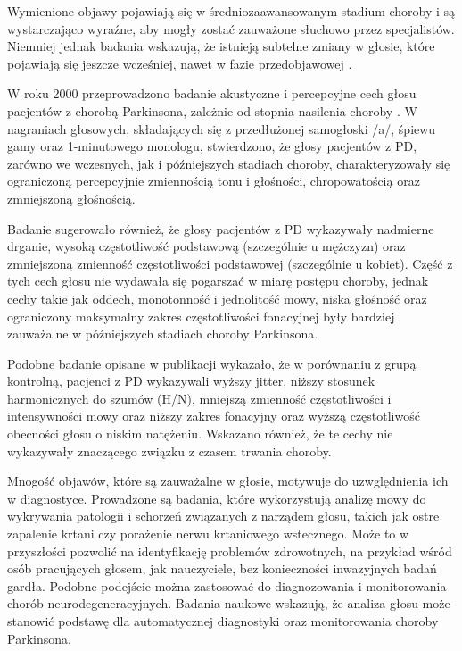 Wymienione objawy pojawiają się w średniozaawansowanym stadium choroby i są wystarczająco wyraźne, aby mogły zostać zauważone słuchowo przez specjalistów.
Niemniej jednak badania wskazują, że istnieją subtelne zmiany w głosie, które pojawiają się jeszcze wcześniej, nawet w fazie przedobjawowej \cite{2023_PD_voice}.

W roku 2000 przeprowadzono badanie akustyczne i percepcyjne cech głosu pacjentów z chorobą Parkinsona, zależnie od stopnia nasilenia choroby \cite{https://doi.org/10.1080/136828200410654}.
W nagraniach głosowych, składających się z przedłużonej samogłoski /a/, śpiewu gamy oraz 1-minutowego monologu, stwierdzono, że głosy pacjentów z PD,
zarówno we wczesnych, jak i późniejszych stadiach choroby, charakteryzowały się ograniczoną percepcyjnie zmiennością tonu i głośności, chropowatością
oraz zmniejszoną głośnością.

Badanie sugerowało również, że głosy pacjentów z PD wykazywały nadmierne drganie, wysoką częstotliwość podstawową (szczególnie u mężczyzn) oraz zmniejszoną zmienność częstotliwości podstawowej (szczególnie u kobiet).
Część z tych cech głosu nie wydawała się pogarszać w miarę postępu choroby, jednak cechy takie jak oddech, monotonność i jednolitość mowy, niska głośność oraz ograniczony maksymalny zakres częstotliwości fonacyjnej były bardziej zauważalne w późniejszych stadiach choroby Parkinsona.

Podobne badanie opisane w publikacji \cite{GAMBOA1997314} wykazało, że w porównaniu z grupą kontrolną, pacjenci z PD wykazywali wyższy jitter, niższy
stosunek harmonicznych do szumów (H/N), mniejszą zmienność częstotliwości i intensywności mowy oraz niższy zakres fonacyjny oraz wyższą częstotliwość
obecności głosu o niskim natężeniu.
Wskazano również, że te cechy nie wykazywały znaczącego związku z czasem trwania choroby.

Mnogość objawów, które są zauważalne w głosie, motywuje do uzwględnienia ich w diagnostyce.
Prowadzone są badania, które wykorzystują analizę mowy do wykrywania patologii i schorzeń związanych z narządem głosu, takich jak ostre zapalenie krtani czy porażenie nerwu krtaniowego wstecznego.
Może to w przyszłości pozwolić na identyfikację problemów zdrowotnych, na przykład wśród osób pracujących głosem, jak nauczyciele, bez konieczności inwazyjnych badań gardła.
Podobne podejście można zastosować do diagnozowania i monitorowania chorób neurodegeneracyjnych.
Badania naukowe wskazują, że analiza głosu może stanowić podstawę dla automatycznej diagnostyki oraz monitorowania choroby Parkinsona.

